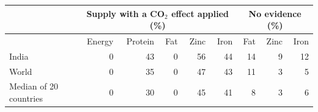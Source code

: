 \begin{tabular}{@{}lrrrrrrrr@{}}
\toprule
 & \multicolumn{5}{c}{Supply with a CO$_2$ effect applied (\%)} & \multicolumn{3}{c}{No evidence (\%)} \\
\midrule
 & Energy & Protein & Fat & Zinc & Iron & Fat & Zinc & Iron \\
India & 0 & 43 & 0 & 56 & 44 & 14 & 9 & 12 \\
World & 0 & 35 & 0 & 47 & 43 & 11 & 3 & 5 \\
Median of 20 countries & 0 & 30 & 0 & 45 & 41 & 8 & 3 & 6 \\
\bottomrule
\end{tabular}
